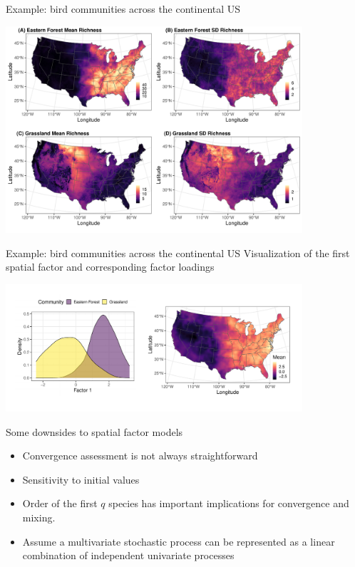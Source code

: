 \begin{frame}{Example: bird communities across the continental US}
	\begin{center}
             \includegraphics[width=11cm]{../figures/Fig1.pdf}
	\end{center}
\end{frame}

\begin{frame}{Example: bird communities across the continental US}
    Visualization of the first spatial factor and corresponding factor loadings
	\begin{center}
             \includegraphics[width=11cm]{../figures/FigS1.pdf}
	\end{center}
\end{frame}

\begin{frame}{Some downsides to spatial factor models}
     \begin{itemize}
	     \item Convergence assessment is not always straightforward
	     \item Sensitivity to initial values 
	     \item Order of the first $q$ species has important implications for convergence and mixing.
	     \item Assume a multivariate stochastic process can be represented as a linear combination of independent univariate processes
     \end{itemize}
\end{frame}

